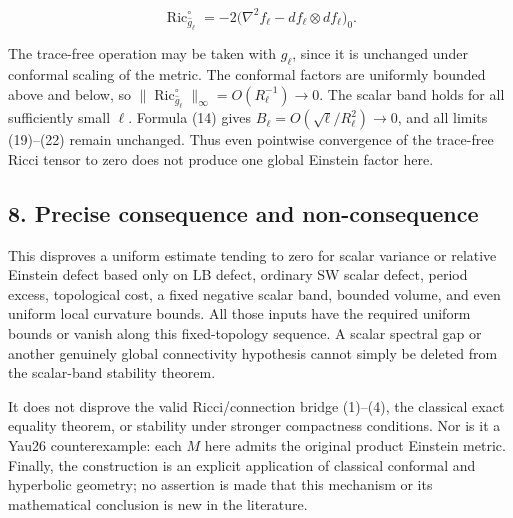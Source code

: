 \documentclass[
  11pt,
]{article}
\begin{document}
\[
 \operatorname{Ric}^{\circ}_{\widehat g_\ell}
 =-2\bigl(\nabla^2f_\ell-df_\ell\otimes df_\ell\bigr)_0.
 \tag{24}
\]

The trace-free operation may be taken with \(g_\ell\), since it is
unchanged under conformal scaling of the metric. The conformal factors
are uniformly bounded above and below, so
\(\|\operatorname{Ric}^{\circ}_{\widehat g_\ell}\|_\infty=O(R_\ell^{-1})\to0\).
The scalar band holds for all sufficiently small \(\ell\). Formula (14)
gives \(B_\ell=O(\sqrt\ell/R_\ell^2)\to0\), and all limits (19)--(22)
remain unchanged. Thus even pointwise convergence of the trace-free
Ricci tensor to zero does not produce one global Einstein factor here.

\hypertarget{precise-consequence-and-non-consequence}{%
\subsection{8. Precise consequence and
non-consequence}\label{precise-consequence-and-non-consequence}}

This disproves a uniform estimate tending to zero for scalar variance or
relative Einstein defect based only on LB defect, ordinary SW scalar
defect, period excess, topological cost, a fixed negative scalar band,
bounded volume, and even uniform local curvature bounds. All those
inputs have the required uniform bounds or vanish along this
fixed-topology sequence. A scalar spectral gap or another genuinely
global connectivity hypothesis cannot simply be deleted from the
scalar-band stability theorem.

It does not disprove the valid Ricci/connection bridge (1)--(4), the
classical exact equality theorem, or stability under stronger
compactness conditions. Nor is it a Yau26 counterexample: each \(M\)
here admits the original product Einstein metric. Finally, the
construction is an explicit application of classical conformal and
hyperbolic geometry; no assertion is made that this mechanism or its
mathematical conclusion is new in the literature.
\end{document}
